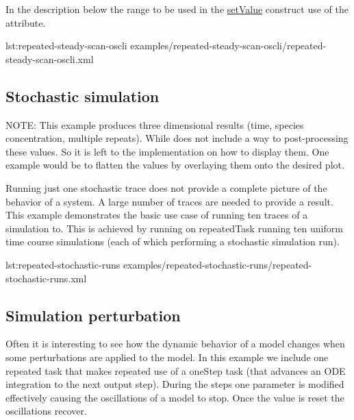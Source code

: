 In the description below the range to be used in the \hyperref[class:setValue]{setValue} construct use of the  attribute.


{lst:repeated-steady-scan-oscli}
{examples/repeated-steady-scan-oscli/repeated-steady-scan-oscli.xml}


\subsection{Stochastic simulation}
NOTE: This example produces three dimensional results (time, species concentration, multiple repeats). While \LoneVtwo does not include a way to post-processing these values. So it is left to the implementation on how to display them. One example would be to flatten the values by overlaying them onto the desired plot. 

Running just one stochastic trace does not provide a complete picture of the behavior of a system. A large number of traces are needed to provide a result. This example demonstrates the basic use case of running ten traces of a simulation to. This is achieved by running on repeatedTask running ten uniform time course simulations (each of which performing a stochastic simulation run). 


{lst:repeated-stochastic-runs}
{examples/repeated-stochastic-runs/repeated-stochastic-runs.xml}


\subsection{Simulation perturbation}
Often it is interesting to see how the dynamic behavior of a model changes when some perturbations are applied to the model. In this example we include one repeated task that makes repeated use of a oneStep task (that advances an ODE integration to the next output step). During the steps one parameter is modified effectively causing the oscillations of a model to stop. Once the value is reset the oscillations recover. 

